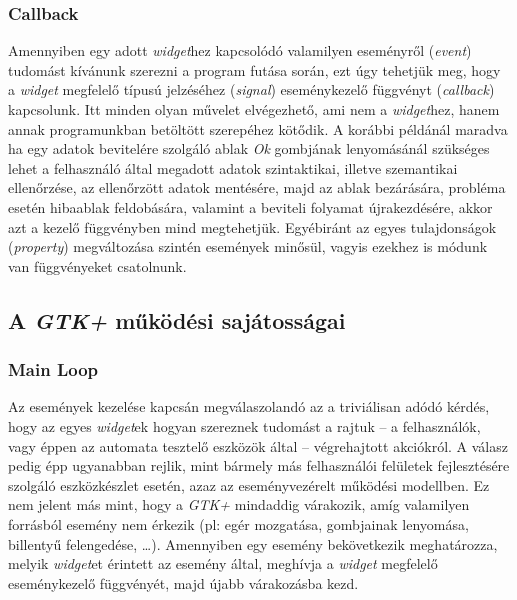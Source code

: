 \subsubsection{Callback}

Amennyiben egy adott \textit{widget}hez kapcsolódó valamilyen eseményről (\textit{event}) tudomást kívánunk szerezni a program futása során, ezt úgy tehetjük meg, hogy a \textit{widget} megfelelő típusú jelzéséhez (\textit{signal}) eseménykezelő függvényt (\textit{callback}) kapcsolunk. Itt minden olyan művelet elvégezhető, ami nem a \textit{widget}hez, hanem annak programunkban betöltött szerepéhez kötődik. A korábbi példánál maradva ha egy adatok bevitelére szolgáló ablak \textit{Ok} gombjának lenyomásánál szükséges lehet a felhasználó által megadott adatok szintaktikai, illetve szemantikai ellenőrzése, az ellenőrzött adatok mentésére, majd az ablak bezárására, probléma esetén hibaablak feldobására, valamint a beviteli folyamat újrakezdésére, akkor azt a kezelő függvényben mind megtehetjük. Egyébiránt az egyes tulajdonságok (\textit{property}) megváltozása szintén események minősül, vagyis ezekhez is módunk van függvényeket csatolnunk.

\subsection{A \textit{GTK+} működési sajátosságai}

\subsubsection{Main Loop}
\label{sec:mainloop}

Az események kezelése kapcsán megválaszolandó az a triviálisan adódó kérdés, hogy az egyes \textit{widget}ek hogyan szereznek tudomást a rajtuk -- a felhasználók, vagy éppen az automata tesztelő eszközök által -- végrehajtott akciókról. A válasz pedig épp ugyanabban rejlik, mint bármely más felhasználói felületek fejlesztésére szolgáló eszközkészlet esetén, azaz az eseményvezérelt működési modellben. Ez nem jelent más mint, hogy a \textit{GTK+} mindaddig várakozik, amíg valamilyen forrásból esemény nem érkezik (pl: egér mozgatása, gombjainak lenyomása, billentyű felengedése, \dots ). Amennyiben egy esemény bekövetkezik meghatározza, melyik \textit{widget}et érintett az esemény által, meghívja a \textit{widget} megfelelő eseménykezelő függvényét, majd újabb várakozásba kezd.


